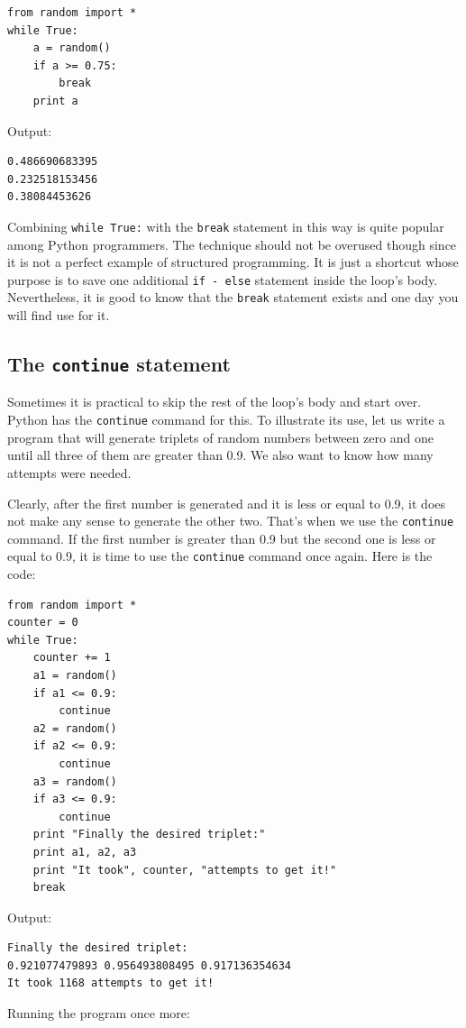 \begin{verbatim}
from random import *
while True:
    a = random()
    if a >= 0.75: 
        break
    print a
\end{verbatim}
Output:

\begin{verbatim}
0.486690683395
0.232518153456
0.38084453626
\end{verbatim}
Combining {\tt while True:} with the {\tt break} statement in this way is 
quite popular among Python programmers. The technique should not be overused 
though since it is not a perfect example of structured programming. It is 
just a shortcut whose purpose is to save one additional {\tt if - else} statement
inside the loop's body. Nevertheless, it is good to know that the 
{\tt break} statement exists and one day you will find use for it.

\subsection{The {\tt continue} statement}

Sometimes it is practical to skip the rest of the loop's body and start over. Python 
has the {\tt continue} command for this. To illustrate its use, let us write 
a program that will generate triplets of random numbers between zero and one
until all three of them are greater than 0.9. We also want to know how many 
attempts were needed. 

Clearly, after the first number is generated and it is less or equal to 0.9,
it does not make any sense to generate the other two. That's when 
we use the {\tt continue} command. If the first number is greater than 0.9 
but the second one is less or equal to 0.9, it is time to use the {\tt continue} 
command once again. Here is the code:

\begin{verbatim}
from random import *
counter = 0
while True:
    counter += 1
    a1 = random()
    if a1 <= 0.9:
        continue
    a2 = random()
    if a2 <= 0.9:
        continue
    a3 = random()
    if a3 <= 0.9:
        continue
    print "Finally the desired triplet:" 
    print a1, a2, a3
    print "It took", counter, "attempts to get it!"
    break
\end{verbatim}
Output:

\begin{verbatim}
Finally the desired triplet:
0.921077479893 0.956493808495 0.917136354634
It took 1168 attempts to get it!
\end{verbatim}
Running the program once more:


